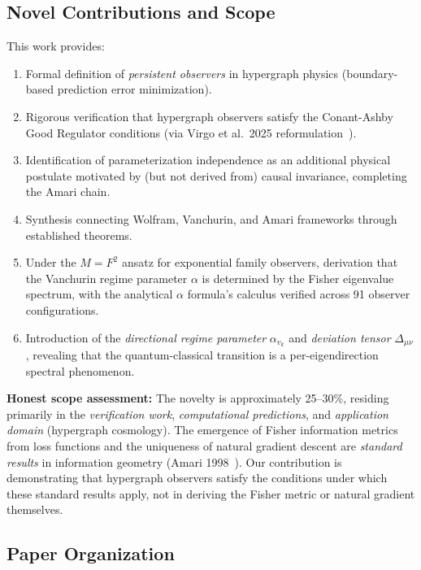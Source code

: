 \documentclass[11pt,a4paper]{article}
\theoremstyle{plain}
\theoremstyle{definition}
\theoremstyle{remark}
\begin{document}
\subsection{Novel Contributions and Scope}

This work provides:
\begin{enumerate}[noitemsep]
\item Formal definition of \emph{persistent observers} in hypergraph physics (boundary-based prediction error minimization).

\item Rigorous verification that hypergraph observers satisfy the Conant-Ashby Good Regulator conditions (via Virgo et al.~2025 reformulation~\cite{virgo2025good}).

\item Identification of parameterization independence as an additional physical postulate motivated by (but not derived from) causal invariance, completing the Amari chain.

\item Synthesis connecting Wolfram, Vanchurin, and Amari frameworks through established theorems.

\item Under the $M = F^2$ ansatz for exponential family observers, derivation that the Vanchurin regime parameter $\alpha$ is determined by the Fisher eigenvalue spectrum, with the analytical $\alpha$ formula's calculus verified across 91 observer configurations.

\item Introduction of the \emph{directional regime parameter} $\alpha_{v_k}$ and \emph{deviation tensor} $\Delta_{\mu\nu}$, revealing that the quantum-classical transition is a per-eigendirection spectral phenomenon.
\end{enumerate}

\textbf{Honest scope assessment:} The novelty is approximately 25--30\%, residing primarily in the \emph{verification work}, \emph{computational predictions}, and \emph{application domain} (hypergraph cosmology). The emergence of Fisher information metrics from loss functions and the uniqueness of natural gradient descent are \emph{standard results} in information geometry (Amari 1998~\cite{amari1998natural,amari2016information}). Our contribution is demonstrating that hypergraph observers satisfy the conditions under which these standard results apply, not in deriving the Fisher metric or natural gradient themselves.

\subsection{Paper Organization}
\end{document}

